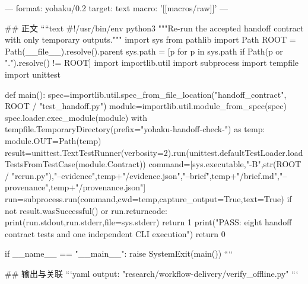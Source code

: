 ---
format: yohaku/0.2
target: text
macro: '[[macros/raw]]'
---

## 正文
````text
#!/usr/bin/env python3
"""Re-run the accepted handoff contract with only temporary outputs."""
import sys
from pathlib import Path
ROOT = Path(__file__).resolve().parent
sys.path = [p for p in sys.path if Path(p or ".").resolve() != ROOT]
import importlib.util
import subprocess
import tempfile
import unittest

def main():
    spec=importlib.util.spec_from_file_location("handoff_contract", ROOT / "test_handoff.py")
    module=importlib.util.module_from_spec(spec)
    spec.loader.exec_module(module)
    with tempfile.TemporaryDirectory(prefix="yohaku-handoff-check-") as temp:
        module.OUT=Path(temp)
        result=unittest.TextTestRunner(verbosity=2).run(unittest.defaultTestLoader.loadTestsFromTestCase(module.Contract))
        command=[sys.executable,"-B",str(ROOT / "rerun.py"),"--evidence",temp+"/evidence.json","--brief",temp+"/brief.md","--provenance",temp+"/provenance.json"]
        run=subprocess.run(command,cwd=temp,capture_output=True,text=True)
        if not result.wasSuccessful() or run.returncode:
            print(run.stdout,run.stderr,file=sys.stderr)
            return 1
        print("PASS: eight handoff contract tests and one independent CLI execution")
        return 0

if __name__ == "__main__":
    raise SystemExit(main())
````

## 输出与关联
```yaml
output: "research/workflow-delivery/verify_offline.py"
```
